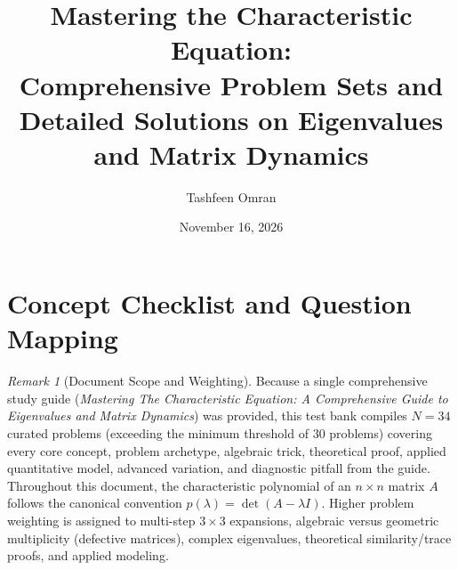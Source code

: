 \documentclass[11pt, letterpaper]{article}
\title{Mastering the Characteristic Equation:\\[4pt]{\large Comprehensive Problem Sets and Detailed Solutions on Eigenvalues and Matrix Dynamics}}
\author{Tashfeen Omran}
\date{November 16, 2026}
\theoremstyle{definition}
\theoremstyle{remark}
\newtheorem{remark}{Remark}[section]
\begin{document}
\maketitle
\tableofcontents
\newpage

\section{Concept Checklist and Question Mapping}

\begin{remark}[Document Scope and Weighting]
Because a single comprehensive study guide (\textit{Mastering The Characteristic Equation: A Comprehensive Guide to Eigenvalues and Matrix Dynamics}) was provided, this test bank compiles $N = 34$ curated problems (exceeding the minimum threshold of $30$ problems) covering every core concept, problem archetype, algebraic trick, theoretical proof, applied quantitative model, advanced variation, and diagnostic pitfall from the guide. Throughout this document, the characteristic polynomial of an $n \times n$ matrix $A$ follows the canonical convention $p(\lambda) = \det(A - \lambda I)$. Higher problem weighting is assigned to multi-step $3 \times 3$ expansions, algebraic versus geometric multiplicity (defective matrices), complex eigenvalues, theoretical similarity/trace proofs, and applied modeling.
\end{remark}
\end{document}
